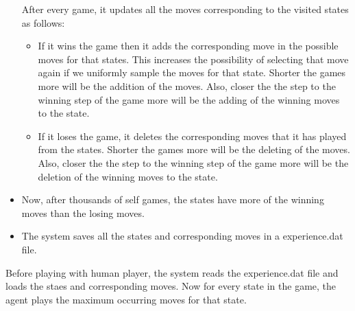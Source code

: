 \documentclass[journal, compsoc]{IEEEtran}
\begin{document}
\begin{itemize}
After every game, it updates all the moves corresponding to the visited states as follows:
\begin{itemize}
\item If it wins the game then it adds the corresponding move in the possible moves for that states. This increases the possibility of selecting that move again if we uniformly sample the moves for that state. Shorter the games more will be the addition of the moves. Also, closer the the step to the winning step of the game more will be the adding of the winning moves to the state.
\item If it loses the game, it deletes the corresponding moves that it has played from the states. Shorter the games more will be the deleting of the moves. Also, closer the the step to the winning step of the game more will be the deletion of the winning moves to the state.
\end{itemize}

\item Now, after thousands of self games, the states have more of the winning moves than the losing moves.
\item The system saves all the states and corresponding moves in a experience.dat file.
    
\end{itemize}
    
Before playing with human player, the system reads the experience.dat file and loads the staes and corresponding moves. Now for every state in the game, the agent plays the maximum occurring moves for that state.


\nocite{Do2008}
\nocite{HMM_Stamp}
\nocite{Menace1}
\nocite{Menace2}

\end{document}
